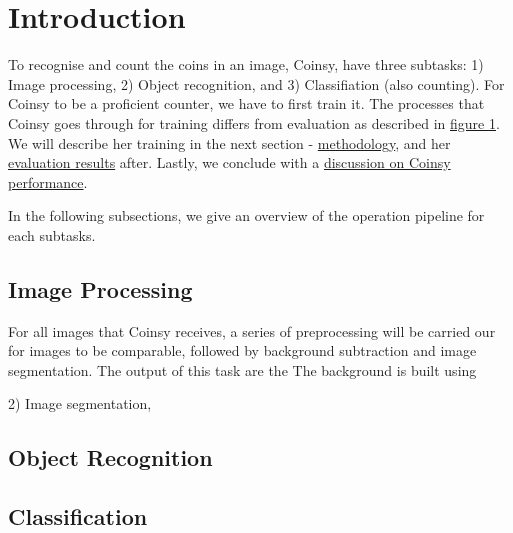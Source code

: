 \documentclass[main.tex]{subfiles}
\begin{document}
\section[intro]{Introduction\hypertarget{sec:intro}{}}


\par
To recognise and count the coins in an image, Coinsy, have three subtasks: 1) Image processing, 2) Object recognition, and 3) Classifiation (also counting).
For Coinsy to be a proficient counter, we have to first train it. The processes that Coinsy goes through for training differs from evaluation as described in \href{trgVSeval}{figure \ref*{trgVSeval}}. We will describe her training in the next section - \hyperlink{method}{methodology}, and her \hyperlink{resut}{evaluation results} after. Lastly, we conclude with a \hyperlink{discussion}{discussion on Coinsy performance}.

\begin{figure}
  \label{trgVSeval}
\end{figure}

In the following subsections, we give an overview of the operation pipeline for each subtasks.

\subsection{Image Processing}
For all images that Coinsy receives, a series of preprocessing will be carried our for images to be comparable, followed by background subtraction and image segmentation. The output of this task are the The background is built using

2) Image segmentation,


\subsection{Object Recognition}


\subsection{Classification}
\end{document}
